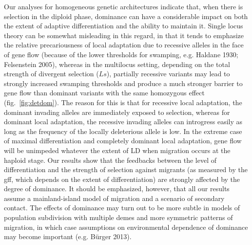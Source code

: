 \documentclass[
  11pt,
]{article}
\begin{document}
Our analyses for homogeneous genetic architectures indicate that, when
there is selection in the diploid phase, dominance can have a
considerable impact on both the extent of adaptive differentiation and
the ability to maintain it. Single locus theory can be somewhat
misleading in this regard, in that it tends to emphasize the relative
precariousness of local adaptation due to recessive alleles in the face
of gene flow (because of the lower thresholds for swamping, e.g. Haldane
1930; Felsenstein 2005), whereas in the multilocus setting, depending on
the total strength of divergent selection (\(Ls\)), partially recessive
variants may lead to strongly increased swamping thresholds and produce
a much stronger barrier to gene flow than dominant variants with the
same homozygous effect (fig.~\ref{fig:detdom}). The reason for this is
that for recessive local adaptation, the dominant invading alleles are
immediately exposed to selection, whereas for dominant local adaptation,
the recessive invading alleles can introgress easily as long as the
frequency of the locally deleterious allele is low. In the extreme case
of maximal differentiation and completely dominant local adaptation,
gene flow will be unimpeded whatever the extent of LD when migration
occurs at the haploid stage. Our results show that the feedbacks between
the level of differentiation and the strength of selection against
migrants (as measured by the gff, which depends on the extent of
differentiation) are strongly affected by the degree of dominance. It
should be emphasized, however, that all our results assume a
mainland-island model of migration and a scenario of secondary contact.
The effects of dominance may turn out to be more subtle in models of
population subdivision with multiple demes and more symmetric patterns
of migration, in which case assumptions on environmental dependence of
dominance may become important (e.g. Bürger 2013).
\end{document}
